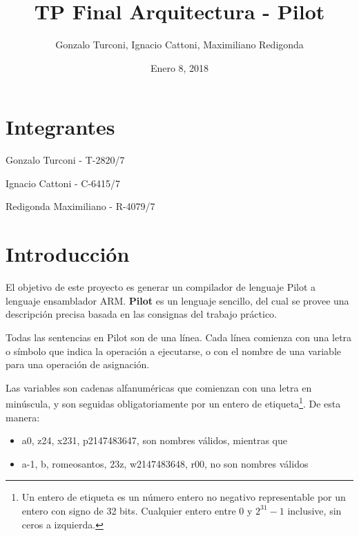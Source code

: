 \documentclass[12pt,spanish]{article}
\begin{document}
 
 
\title{TP Final Arquitectura - Pilot}
\author{Gonzalo Turconi, Ignacio Cattoni, Maximiliano Redigonda}
\date{Enero 8, 2018}
 
\maketitle

\section{Integrantes}

Gonzalo Turconi - T-2820/7

\noindent
Ignacio Cattoni - C-6415/7

\noindent
Redigonda Maximiliano - R-4079/7
\section{Introducción}
El objetivo de este proyecto es generar un compilador de lenguaje Pilot a lenguaje ensamblador ARM. \textbf{Pilot} es un lenguaje sencillo, del cual se provee una descripción precisa basada en las consignas del trabajo práctico.

Todas las sentencias en Pilot son de una línea. Cada línea comienza con una letra o símbolo que indica la operación a ejecutarse, o con el nombre de una variable para una operación de asignación.

Las variables son cadenas alfanuméricas que comienzan con una letra en minúscula, y son seguidas obligatoriamente por un entero de etiqueta\footnote{Un entero de etiqueta es un número entero no negativo representable por un entero con signo de 32 bits. Cualquier entero entre $0$ y $2^{31}-1$ inclusive, sin ceros a izquierda.}. De esta manera:
\begin{itemize}
\item{a0, z24, x231, p2147483647, son nombres válidos, mientras que}
\item{a-1, b, romeosantos, 23z, w2147483648, r00, no son nombres válidos}
\end{itemize}
\end{document}
